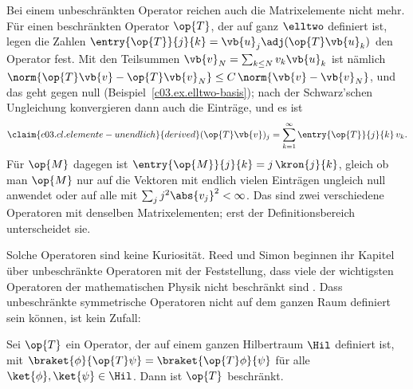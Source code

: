 \begin{vertiefung}
  Bei einem unbeschränkten Operator reichen auch die Matrixelemente nicht mehr. Für einen
  beschränkten Operator $\op{T}$, der auf ganz $\elltwo$ definiert ist, legen die Zahlen
  $\entry{\op{T}}{j}{k} = \vb{u}_j\adj (\op{T}\vb{u}_k)$ den Operator fest. Mit den Teilsummen
  $\vb{v}_N = \sum_{k \leq N} v_k \vb{u}_k$ ist nämlich
  $\norm{\op{T}\vb{v} - \op{T}\vb{v}_N} \leq C\, \norm{\vb{v} - \vb{v}_N}$, und das geht gegen
  null (Beispiel~\ref{c03.ex.elltwo-basis}); nach der Schwarz'schen Ungleichung konvergieren
  dann auch die Einträge, und es ist
  \begin{equation}\label{c03.eq.elemente-unendlich}\claim{c03.cl.elemente-unendlich}{derived}
    (\op{T}\vb{v})_j = \sum_{k=1}^{\infty} \entry{\op{T}}{j}{k}\, v_k .
  \end{equation}
  Für $\op{M}$ dagegen ist $\entry{\op{M}}{j}{k} = j\, \kron{j}{k}$, gleich ob man $\op{M}$ nur
  auf die Vektoren mit endlich vielen Einträgen ungleich null anwendet oder auf alle mit
  $\sum_j j^2 \abs{v_j}^2 < \infty$. Das sind zwei verschiedene Operatoren mit denselben
  Matrixelementen; erst der Definitionsbereich unterscheidet sie.

  Solche Operatoren sind keine Kuriosität. Reed und Simon beginnen ihr Kapitel über
  unbeschränkte Operatoren mit der Feststellung, dass viele der wichtigsten Operatoren der
  mathematischen Physik nicht beschränkt sind . Dass unbeschränkte
  symmetrische Operatoren nicht auf dem ganzen Raum definiert sein können, ist kein Zufall:

  \begin{theorem}\label{c03.thm.hellinger-toeplitz}
    Sei $\op{T}$ ein Operator, der auf einem ganzen Hilbertraum $\Hil$ definiert ist, mit
    $\braket{\phi}{\op{T}\psi} = \braket{\op{T}\phi}{\psi}$ für alle
    $\ket{\phi}, \ket{\psi} \in \Hil$. Dann ist $\op{T}$ beschränkt.
  \end{theorem}


\end{vertiefung}
